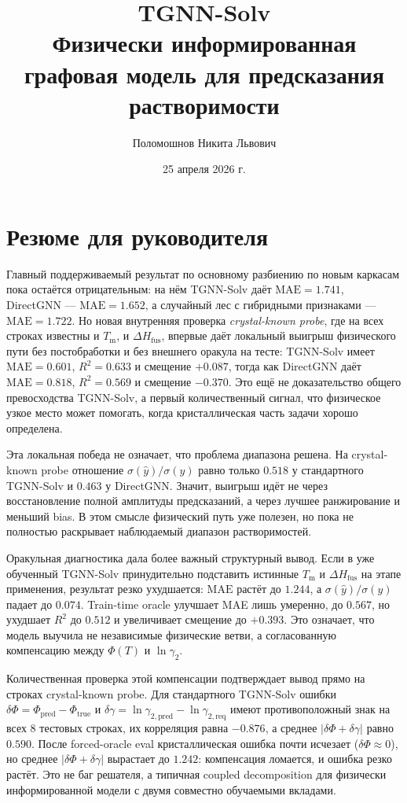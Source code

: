 \documentclass[11pt]{article}
\title{TGNN-Solv\\
\large Физически информированная графовая модель для предсказания растворимости}
\author{Поломошнов Никита Львович}
\date{25 апреля 2026 г.}
\newcommand{\mae}{\mathrm{MAE}}
\newcommand{\Rtwo}{R^2}
\newcommand{\abs}[1]{\left\lvert #1 \right\rvert}
\newcommand{\Tm}{T_{\mathrm m}}
\newcommand{\dHfus}{\Delta H_{\mathrm{fus}}}
\theoremstyle{definition}
\begin{document}
\sloppy
\raggedbottom
\maketitle
\newpage

\section*{Резюме для руководителя}

Главный поддерживаемый результат по основному разбиению по новым каркасам пока остаётся отрицательным: на нём TGNN-Solv даёт $\mae=1.741$, DirectGNN --- $\mae=1.652$, а случайный лес с гибридными признаками --- $\mae=1.722$. Но новая внутренняя проверка \emph{crystal-known probe}, где на всех строках известны и $\Tm$, и $\dHfus$, впервые даёт локальный выигрыш физического пути без постобработки и без внешнего оракула на тесте: TGNN-Solv имеет $\mae=0.601$, $\Rtwo=0.633$ и смещение $+0.087$, тогда как DirectGNN даёт $\mae=0.818$, $\Rtwo=0.569$ и смещение $-0.370$. Это ещё не доказательство общего превосходства TGNN-Solv, а первый количественный сигнал, что физическое узкое место может помогать, когда кристаллическая часть задачи хорошо определена.

Эта локальная победа не означает, что проблема диапазона решена. На crystal-known probe отношение $\sigma(\hat y)/\sigma(y)$ равно только $0.518$ у стандартного TGNN-Solv и $0.463$ у DirectGNN. Значит, выигрыш идёт не через восстановление полной амплитуды предсказаний, а через лучшее ранжирование и меньший bias. В этом смысле физический путь уже полезен, но пока не полностью раскрывает наблюдаемый диапазон растворимостей.

Оракульная диагностика дала более важный структурный вывод. Если в уже обученный TGNN-Solv принудительно подставить истинные $\Tm$ и $\dHfus$ на этапе применения, результат резко ухудшается: $\mae$ растёт до $1.244$, а $\sigma(\hat y)/\sigma(y)$ падает до $0.074$. Train-time oracle улучшает MAE лишь умеренно, до $0.567$, но ухудшает $\Rtwo$ до $0.512$ и увеличивает смещение до $+0.393$. Это означает, что модель выучила не независимые физические ветви, а согласованную компенсацию между $\Phi(T)$ и $\ln\gamma_2$.

Количественная проверка этой компенсации подтверждает вывод прямо на строках crystal-known probe. Для стандартного TGNN-Solv ошибки $\delta\Phi=\Phi_{\mathrm{pred}}-\Phi_{\mathrm{true}}$ и $\delta\gamma=\ln\gamma_{2,\mathrm{pred}}-\ln\gamma_{2,\mathrm{req}}$ имеют противоположный знак на всех $8$ тестовых строках, их корреляция равна $-0.876$, а среднее $\abs{\delta\Phi+\delta\gamma}$ равно $0.590$. После forced-oracle eval кристаллическая ошибка почти исчезает ($\delta\Phi\approx0$), но среднее $\abs{\delta\Phi+\delta\gamma}$ вырастает до $1.242$: компенсация ломается, и ошибка резко растёт. Это не баг решателя, а типичная coupled decomposition для физически информированной модели с двумя совместно обучаемыми вкладами.
\end{document}
